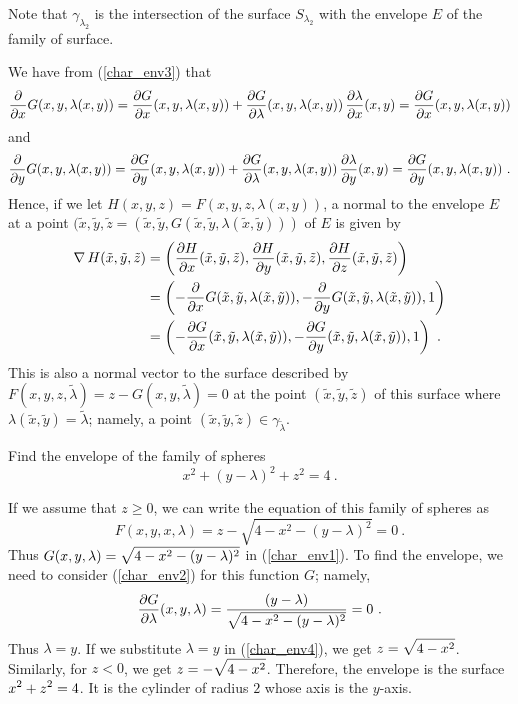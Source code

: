 Note that $\gamma_{\lambda_2}$ is the intersection of the
surface $S_{\lambda_2}$ with the envelope $E$ of the family of
surface.

\begin{rmk}
We have from (\ref{char_env3}) that               \label{char_env_tgp}
\[
\pdfdx{G(x,y,\lambda(x,y))}{x}
= \pdydx{G}{x}(x,y,\lambda(x,y)) + \pdydx{G}{\lambda}(x,y,\lambda(x,y))\,
 \pdydx{\lambda}{x}(x,y) = \pdydx{G}{x}(x,y,\lambda(x,y))
\]
and
\[
\pdfdx{G(x,y,\lambda(x,y))}{y}
= \pdydx{G}{y}(x,y,\lambda(x,y)) + \pdydx{G}{\lambda}(x,y,\lambda(x,y))\,
 \pdydx{\lambda}{y}(x,y) = \pdydx{G}{y}(x,y,\lambda(x,y)) \ .
\]
Hence, if we let $H(x,y,z) = F(x,y,z,\lambda(x,y))$, a normal to the
envelope $E$ at a point
$(\tilde{x},\tilde{y},\tilde{z}
= (\tilde{x},\tilde{y},G(\tilde{x},\tilde{y},\lambda(\tilde{x},\tilde{y})))$
of $E$ is given by
\begin{align*}
\graD H(\tilde{x},\tilde{y},\tilde{z}) &=
\left( \pdydx{H}{x}(\tilde{x},\tilde{y},\tilde{z}) ,
\pdydx{H}{y}(\tilde{x},\tilde{y},\tilde{z}) ,
\pdydx{H}{z}(\tilde{x},\tilde{y},\tilde{z}) \right) \\
&= \left( -\pdfdx{G(\tilde{x},\tilde{y},\lambda(\tilde{x},\tilde{y}))}{x} ,
-\pdfdx{G(\tilde{x},\tilde{y},\lambda(\tilde{x},\tilde{y}))}{y}, 1 \right) \\
&= \left( -\pdydx{G}{x}(\tilde{x},\tilde{y},\lambda(\tilde{x},\tilde{y})) ,
-\pdydx{G}{y}(\tilde{x},\tilde{y},\lambda(\tilde{x},\tilde{y})), 1 \right) \ .
\end{align*}
This is also a normal vector to the surface described by
$F(x,y,z,\tilde{\lambda}) = z - G(x,y,\tilde{\lambda}) = 0$
at the point $(\tilde{x},\tilde{y},\tilde{z})$ of this surface where
$\lambda(\tilde{x},\tilde{y}) = \tilde{\lambda}$; namely, a point    
$(\tilde{x},\tilde{y},\tilde{z}) \in \gamma_{\tilde{\lambda}}$.
\end{rmk}

\begin{egg}
Find the envelope of the family of spheres
\[
x^2 + (y-\lambda)^2 + z^2 = 4 \ .
\]

If we assume that $z \geq 0$, we can write the equation of this
family of spheres as
\begin{equation} \label{char_env4}
F(x,y,x,\lambda) = z - \sqrt{4-x^2-(y-\lambda)^2} = 0 \ .
\end{equation}
Thus $\DS G(x,y,\lambda) = \sqrt{4-x^2-(y-\lambda)^2}$ in
(\ref{char_env1}).  To find the envelope, we need to consider
(\ref{char_env2}) for this function $G$; namely,
\[
\pdydx{G}{\lambda}(x,y,\lambda) =
\frac{(y-\lambda)}{\sqrt{4-x^2-(y-\lambda)^2}} = 0 \ .
\]
Thus $\lambda = y$.  If we substitute $\lambda = y$ in
(\ref{char_env4}), we get $\DS z = \sqrt{4-x^2}$.
Similarly, for $z<0$, we get $\DS z = -\sqrt{4-x^2}$.
Therefore, the envelope is the surface $\DS x^2 + z^2 = 4$.
It is the cylinder of radius $2$ whose axis is the $y$-axis.
\end{egg}

